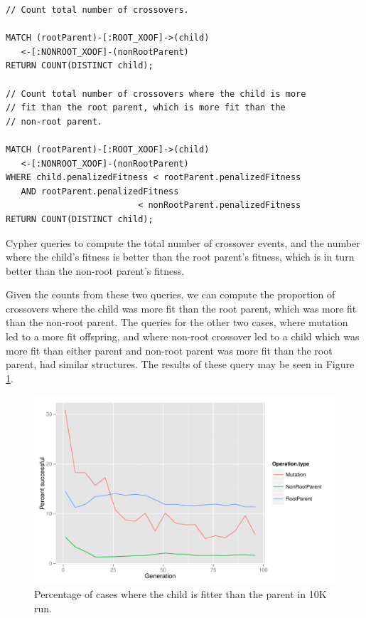 \documentclass[12pt]{article}
\begin{document}
\begin{Query}
\begin{verbatim}
// Count total number of crossovers.

MATCH (rootParent)-[:ROOT_XOOF]->(child)
   <-[:NONROOT_XOOF]-(nonRootParent)
RETURN COUNT(DISTINCT child);

// Count total number of crossovers where the child is more
// fit than the root parent, which is more fit than the
// non-root parent.

MATCH (rootParent)-[:ROOT_XOOF]->(child)
   <-[:NONROOT_XOOF]-(nonRootParent)
WHERE child.penalizedFitness < rootParent.penalizedFitness 
   AND rootParent.penalizedFitness 
                          < nonRootParent.penalizedFitness
RETURN COUNT(DISTINCT child);
\end{verbatim}
\caption{Cypher queries to compute the total number of crossover events, and the number where the child's fitness is better than the root parent's fitness, which is in turn better than the non-root parent's fitness.}
\label{query:effectivenessMutationCrossover}
\end{Query}

Given the counts from these two queries, we can compute the proportion of crossovers where the child was more fit than the root parent, which was more fit than the non-root parent. The queries for the other two cases, where mutation led to a more fit offspring, and where non-root crossover led to a child which was more fit than either parent and non-root parent was more fit than the root parent, had similar structures. The results of these query may be seen in Figure \ref{fig:improvedFitness}.

\begin{figure}[p]
 \centering
 \includegraphics[height=0.63\textwidth]{Blocked_success_percentages}
 \caption{Percentage of cases where the child is fitter than the parent in 10K run.}
 \label{fig:improvedFitness}
\end{figure}
\end{document}
